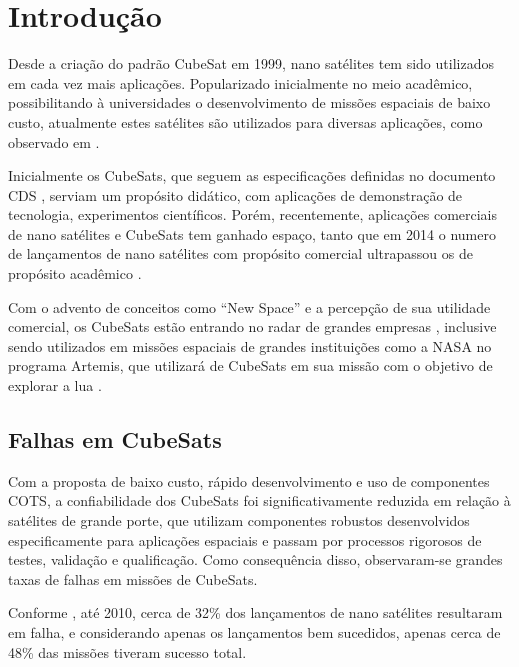 \chapter{Introdução}\label{cap:intro}

Desde a criação do padrão CubeSat em 1999, nano satélites tem sido utilizados em cada vez mais aplicações. Popularizado inicialmente no meio acadêmico, possibilitando à universidades o desenvolvimento de missões espaciais de baixo custo, atualmente estes satélites são utilizados para diversas aplicações, como observado em \textcite{modern-small-sats-economics}.

Inicialmente os CubeSats, que seguem as especificações definidas no documento \gls{CDS} \cite{cds}, serviam um propósito didático, com aplicações de demonstração de tecnologia, experimentos científicos.
Porém, recentemente, aplicações comerciais de nano satélites e CubeSats tem ganhado espaço, tanto que em 2014 o numero de lançamentos de nano satélites com propósito comercial ultrapassou os de propósito acadêmico \cite{modern-small-sats-economics}.

Com o advento de conceitos como “New Space” e a percepção de sua utilidade comercial, os CubeSats estão entrando no radar de grandes empresas \cite{modern-small-sats-economics}, inclusive sendo utilizados em missões espaciais de grandes instituições como a NASA no programa Artemis, que utilizará de CubeSats em sua missão com o objetivo de explorar a lua \cite{artemis-plan}.

\section{Falhas em CubeSats}\label{sec:intro-falhas}

Com a proposta de baixo custo, rápido desenvolvimento e uso de componentes \gls{COTS}, a confiabilidade dos CubeSats foi significativamente reduzida em relação à satélites de grande porte, que utilizam componentes robustos desenvolvidos especificamente para aplicações espaciais e passam por processos rigorosos de testes, validação e qualificação.
Como consequência disso, observaram-se grandes taxas de falhas em missões de CubeSats.

Conforme \textcite{survey-nanosat-missions-2010}, até 2010, cerca de 32\% dos lançamentos de nano satélites resultaram em falha, e considerando apenas os lançamentos bem sucedidos, apenas cerca de 48\% das missões tiveram sucesso total.

